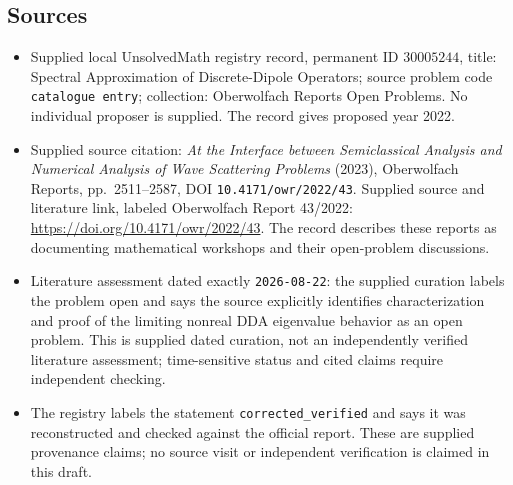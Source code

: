 \documentclass[11pt]{article}
\begin{document}
\subsection{Sources}
\begin{itemize}
\item Supplied local UnsolvedMath registry record, permanent ID \(30005244\), title: Spectral Approximation of Discrete-Dipole Operators; source problem code \texttt{catalogue entry}; collection: Oberwolfach Reports Open Problems. No individual proposer is supplied. The record gives proposed year 2022.
\item Supplied source citation: \emph{At the Interface between Semiclassical Analysis and Numerical Analysis of Wave Scattering Problems} (2023), Oberwolfach Reports, pp.~2511--2587, DOI \texttt{10.4171/owr/2022/43}. Supplied source and literature link, labeled Oberwolfach Report 43/2022: \url{https://doi.org/10.4171/owr/2022/43}. The record describes these reports as documenting mathematical workshops and their open-problem discussions.
\item Literature assessment dated exactly \texttt{2026-08-22}: the supplied curation labels the problem open and says the source explicitly identifies characterization and proof of the limiting nonreal DDA eigenvalue behavior as an open problem. This is supplied dated curation, not an independently verified literature assessment; time-sensitive status and cited claims require independent checking.
\item The registry labels the statement \texttt{corrected\_verified} and says it was reconstructed and checked against the official report. These are supplied provenance claims; no source visit or independent verification is claimed in this draft.
\end{itemize}
\end{document}
